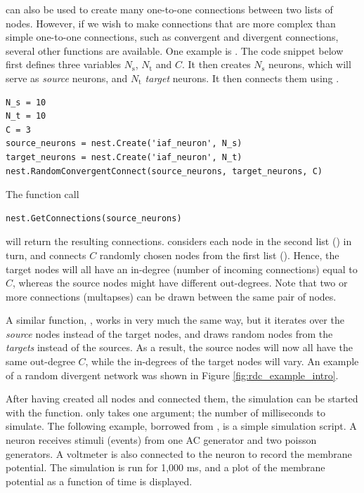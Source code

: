  can also be used to create many one-to-one connections between two lists of nodes. However, if we wish to make connections that are more \linebreak complex than simple one-to-one connections, such as convergent and \linebreak divergent connections, several other functions are available. One example is \linebreak{}. The code snippet below first defines three \linebreak variables $N_\text{s}$, $N_\text{t}$ and $C$. It then creates $N_\text{s}$ neurons, which will serve \linebreak as \emph{source} neurons, and $N_\text{t}$ \emph{target} neurons. It then connects them using \linebreak {}. 
\begin{lstlisting}
N_s = 10
N_t = 10
C = 3
source_neurons = nest.Create('iaf_neuron', N_s)
target_neurons = nest.Create('iaf_neuron', N_t)
nest.RandomConvergentConnect(source_neurons, target_neurons, C)
\end{lstlisting}
The function call
\begin{lstlisting}
nest.GetConnections(source_neurons)
\end{lstlisting}
will return the resulting connections.  considers each node in the second list () in turn, and connects $C$ randomly chosen nodes from the first list (). Hence, the target nodes will all have an in-degree (number of incoming connections) equal to $C$, whereas the source nodes might have different out-degrees. Note that two or more connections (multapses) can be drawn between the same pair of nodes. 

A similar function, , works in very much the same way, but it iterates over the \emph{source} nodes instead of the target nodes, and draws random nodes from the \emph{targets} instead of the sources. As a result, the source nodes will now all have the same out-degree $C$, while the in-degrees of the target nodes will vary. An example of a random divergent network was shown in Figure \ref{fig:rdc_example_intro}.

After having created all nodes and connected them, the simulation can be started with the  function.  only takes one argument; the number of milliseconds to simulate. The following example, borrowed from , is a simple simulation script. A neuron receives stimuli (events) from one AC generator and two poisson generators. A voltmeter is also connected to the neuron to record the membrane potential. The simulation is run for 1,000 ms, and a plot of the membrane potential as a function of time is displayed.

